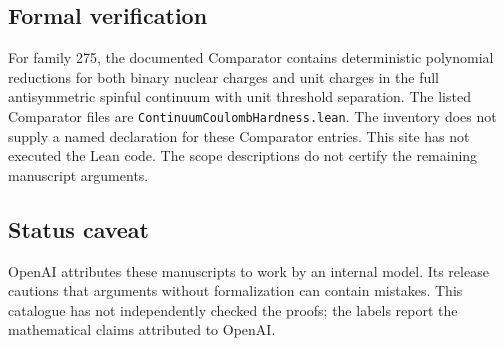 \documentclass[11pt]{article}
\begin{document}
\subsection{Formal verification}
For family 275, the documented Comparator contains deterministic polynomial reductions for both binary nuclear charges and unit charges in the full antisymmetric spinful continuum with unit threshold separation. The listed Comparator files are \texttt{ContinuumCoulombHardness.lean}. The inventory does not supply a named declaration for these Comparator entries. This site has not executed the Lean code. The scope descriptions do not certify the remaining manuscript arguments.

\subsection{Status caveat}
OpenAI attributes these manuscripts to work by an internal model. Its release cautions that arguments without formalization can contain mistakes. This catalogue has not independently checked the proofs; the labels report the mathematical claims attributed to OpenAI.
\end{document}
